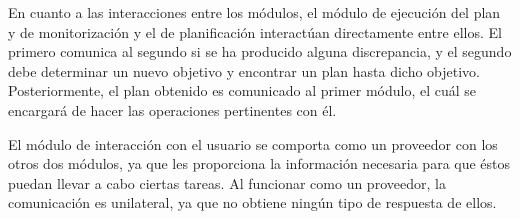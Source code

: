 En cuanto a las interacciones entre los módulos, el módulo de ejecución del plan y de
monitorización y el de planificación interactúan directamente entre ellos. El primero
comunica al segundo si se ha producido alguna discrepancia, y el segundo debe determinar
un nuevo objetivo y encontrar un plan hasta dicho objetivo. Posteriormente, el plan obtenido
es comunicado al primer módulo, el cuál se encargará de hacer las operaciones pertinentes
con él.

El módulo de interacción con el usuario se comporta como un proveedor con los otros dos
módulos, ya que les proporciona la información necesaria para que éstos puedan
llevar a cabo ciertas tareas. Al funcionar como un proveedor, la comunicación es unilateral,
ya que no obtiene ningún tipo de respuesta de ellos.
